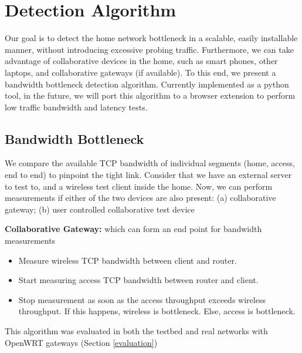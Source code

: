 \section{Detection Algorithm}

Our goal is to detect the home network bottleneck in a scalable, easily installable manner, without introducing excessive probing traffic. Furthermore, we can take advantage of collaborative devices in the home, such as smart phones, other laptops, and collaborative gateways (if available). To this end, we present a bandwidth bottleneck detection algorithm. Currently implemented as a python tool, in the future, we will port this algorithm to a browser extension to perform low traffic bandwidth and latency tests.

\subsection{Bandwidth Bottleneck}
\label{bandwidth}

We compare the available TCP bandwidth of individual segments (home, access, end to end) to pinpoint the tight link. Consider that we have an external server to test to, and a wireless test client inside the home. Now, we can perform measurements if either of the two devices are also present: (a) collaborative gateway; (b) user controlled collaborative test device

\textbf{Collaborative Gateway:} which can form an end point for bandwidth measurements
\begin{itemize}%
\item Measure wireless TCP bandwidth between client and router.
\item Start measuring access TCP bandwidth between router and client.
\item Stop measurement as soon as the access throughput exceeds wireless throughput. If this happens, wireless is bottleneck. Else, access is bottleneck.
\end{itemize}
This algorithm was evaluated in both the testbed and real networks with OpenWRT gateways (Section \ref{evaluation})

